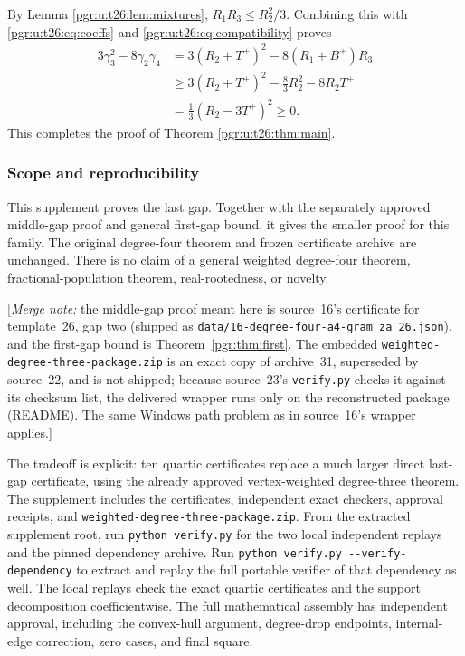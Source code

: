 \documentclass[11pt]{article}
\numberwithin{equation}{section}
\theoremstyle{definition}\newtheorem{definition}[theorem]{Definition}\newtheorem{remark}[theorem]{Remark}
\newcommand{\Bp}{B^{+}}                    %
\newcommand{\Tp}{T^{+}}                    %
\newcommand{\file}[1]{\nolinkurl{#1}}     %
\newcommand{\mnote}[1]{[\textit{Merge note:} #1]}
\begin{document}
By Lemma \ref{pgr:u:t26:lem:mixtures}, $R_1R_3\le R_2^2/3$. Combining this with \eqref{pgr:u:t26:eq:coeffs} and \eqref{pgr:u:t26:eq:compatibility} proves
\begin{align*}
3\gamma_3^2-8\gamma_2\gamma_4
 &=3(R_2+\Tp)^2-8(R_1+\Bp)R_3\\
 &\ge 3(R_2+\Tp)^2-\frac83 R_2^2-8R_2\Tp\\
 &=\frac13(R_2-3\Tp)^2\ge0.
\end{align*}
This completes the proof of Theorem \ref{pgr:u:t26:thm:main}.

\subsubsection*{Scope and reproducibility}
This supplement proves the last gap. Together with the separately approved middle-gap proof and general first-gap bound, it gives the smaller proof for this family. The original degree-four theorem and frozen certificate archive are unchanged. There is no claim of a general weighted degree-four theorem, fractional-population theorem, real-rootedness, or novelty.

\mnote{the middle-gap proof meant here is source~16's certificate for
template~26, gap two (shipped as \texttt{data/16-degree-four-a4-gram\_za\_26.json}),
and the first-gap bound is Theorem~\ref{pgr:thm:first}. The embedded
\file{weighted-degree-three-package.zip} is an exact copy of archive~31,
superseded by source~22, and is not shipped; because source~23's
\texttt{verify.py} checks it against its checksum list, the delivered
wrapper runs only on the reconstructed package (README). The same Windows
path problem as in source~16's wrapper applies.}


The tradeoff is explicit: ten quartic certificates replace a much larger direct last-gap certificate, using the already approved vertex-weighted degree-three theorem. The supplement includes the certificates, independent exact checkers, approval receipts, and \file{weighted-degree-three-package.zip}. From the extracted supplement root, run \verb|python verify.py| for the two local independent replays and the pinned dependency archive. Run \verb|python verify.py --verify-dependency| to extract and replay the full portable verifier of that dependency as well.
The local replays check the exact quartic certificates and the support decomposition coefficientwise. The full mathematical assembly has independent approval, including the convex-hull argument, degree-drop endpoints, internal-edge correction, zero cases, and final square.
\end{document}

